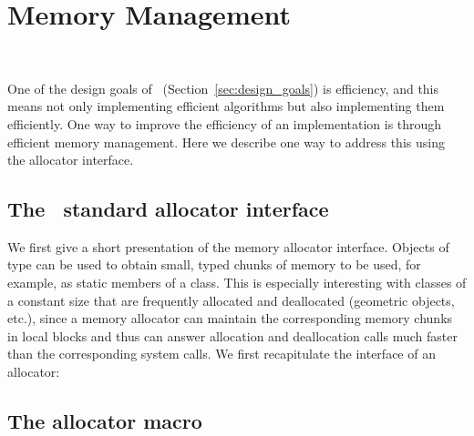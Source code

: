 
\chapter{Memory Management}
\label{chap:memory_management}
 \\

One of the design goals of \cgal\ (Section~\ref{sec:design_goals}) is 
efficiency,
and this means not only implementing efficient algorithms
but also implementing them efficiently.  One way to improve the efficiency
of an implementation is through efficient memory management.  Here we
describe one way to address this using the allocator interface.

\section{The \CC\ standard allocator interface}
\label{sec:allocator_interface}

We first give a short presentation of the memory allocator interface.
Objects of type  can be used to obtain small, typed 
chunks of memory to be used, for example, as static members of a class. 
This is especially
interesting with classes of a constant size that are frequently
allocated and deallocated (geometric objects, etc.), since a memory
allocator can maintain the corresponding memory chunks in local blocks
and thus can answer allocation and deallocation calls much faster than
the corresponding system calls. We first recapitulate the interface of
an allocator:



\section{The allocator macro}
\label{sec:allocator_macro}

